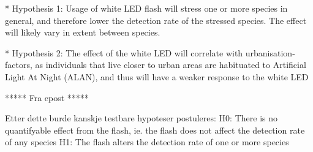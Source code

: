* Hypothesis 1: Usage of white LED flash will stress one or more species in general, and therefore lower the detection rate of the stressed species. The effect will likely vary in extent between species.

* Hypothesis 2: The effect of the white LED will correlate with urbanisation-factors, as individuals that live closer to urban areas are habituated to Artificial Light At Night (ALAN), and thus will have a weaker response to the white LED



*****
Fra epost
*****

Etter dette burde kanskje testbare hypoteser postuleres:
H0: There is no quantifyable effect from the flash, ie. the flash does not affect the detection rate of any species
H1: The flash alters the detection rate of one or more species
